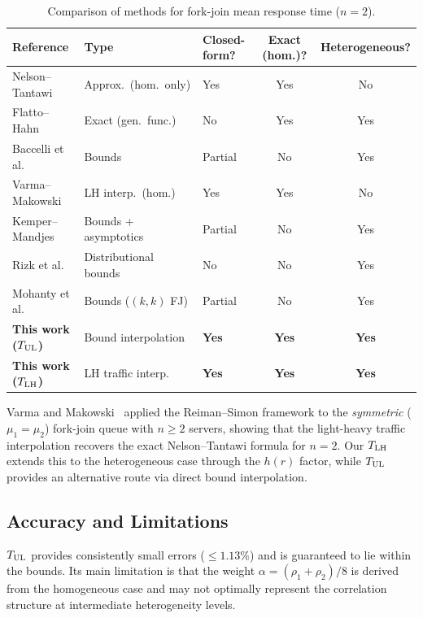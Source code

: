 \begin{table}[ht]
\centering
\caption{Comparison of methods for fork-join mean response time ($n = 2$).}
\label{tab:comparison}
\begin{tabular}{@{}lllcc@{}}
\toprule
Reference & Type & Closed-form? & Exact (hom.)? & Heterogeneous? \\
\midrule
Nelson--Tantawi~\citep{Nelson1988} & Approx.\ (hom.\ only) & Yes & Yes & No \\
Flatto--Hahn~\citep{Flatto1984,Flatto1985} & Exact (gen.\ func.) & No & Yes & Yes \\
Baccelli et al.~\citep{Baccelli1989} & Bounds & Partial & No & Yes \\
Varma--Makowski~\citep{Varma1994} & LH interp.\ (hom.) & Yes & Yes & No \\
Kemper--Mandjes~\citep{Kemper2012} & Bounds + asymptotics & Partial & No & Yes \\
Rizk et al.~\citep{Rizk2015} & Distributional bounds & No & No & Yes \\
Mohanty et al.~\citep{Mohanty2024} & Bounds ($(k,k)$ FJ) & Partial & No & Yes \\
\textbf{This work ($T_{\text{UL}}$)} & Bound interpolation & \textbf{Yes} & \textbf{Yes} & \textbf{Yes} \\
\textbf{This work ($T_{\text{LH}}$)} & LH traffic interp. & \textbf{Yes} & \textbf{Yes} & \textbf{Yes} \\
\bottomrule
\end{tabular}
\end{table}

Varma and Makowski~\citep{Varma1994} applied the Reiman--Simon framework to
the \emph{symmetric} ($\mu_1 = \mu_2$) fork-join queue with $n \geq 2$ servers,
showing that the light-heavy traffic interpolation recovers the exact
Nelson--Tantawi formula for $n = 2$.
Our $T_{\text{LH}}$ extends this to the heterogeneous case through the $h(r)$ factor,
while $T_{\text{UL}}$ provides an alternative route via direct bound interpolation.

\subsection{Accuracy and Limitations}

$T_{\text{UL}}$ provides consistently small errors ($\leq 1.13\%$) and is
guaranteed to lie within the bounds.
Its main limitation is that the weight $\alpha = (\rho_1+\rho_2)/8$ is
derived from the homogeneous case and may not optimally represent the
correlation structure at intermediate heterogeneity levels.

